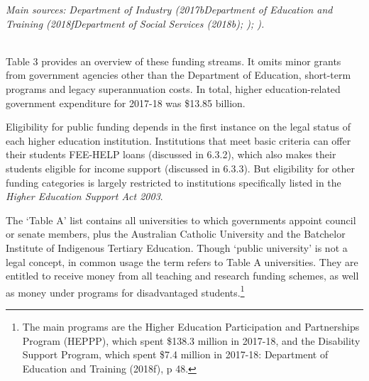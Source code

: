\documentclass{grattan}
\begin{document}
\begin{table}

\end{table}

\emph{Main sources:} \emph{Department of Industry (2017bDepartment of Education and Training (2018fDepartment of Social Services (2018b); ); ).}

\emph{\\
}Table 3 provides an overview of these funding streams. It omits minor grants from government agencies other than the Department of Education, short-term programs and legacy superannuation costs. In total, higher education-related government expenditure for 2017-18 was \$13.85 billion.

Eligibility for public funding depends in the first instance on the legal status of each higher education institution. Institutions that meet basic criteria can offer their students FEE-HELP loans (discussed in 6.3.2), which also makes their students eligible for income support (discussed in 6.3.3). But eligibility for other funding categories is largely restricted to institutions specifically listed in the \emph{Higher Education Support Act 2003}.

The `Table A' list contains all universities to which governments appoint council or senate members, plus the Australian Catholic University and the Batchelor Institute of Indigenous Tertiary Education. Though `public university' is not a legal concept, in common usage the term refers to Table A universities. They are entitled to receive money from all teaching and research funding schemes, as well as money under programs for disadvantaged students.\footnote{The main programs are the Higher Education Participation and Partnerships Program (HEPPP), which spent \$138.3 million in 2017-18, and the Disability Support Program, which spent \$7.4 million in 2017-18: Department of Education and Training (2018f), p 48.}
\end{document}
